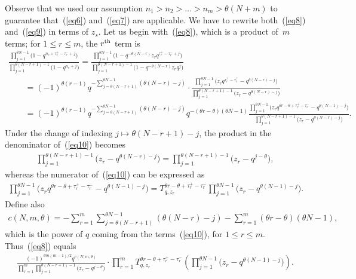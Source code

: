 \documentclass[pdftex]{sigma}
\numberwithin{equation}{section}
\begin{document}
Observe that we used our assumption $n_1 > n_2 > \dots > n_m > \theta (N + m)$ to guarantee that~(\ref{eq6}) and~(\ref{eq7}) are applicable. We have to rewrite both~(\ref{eq8}) and~(\ref{eq9}) in terms of $z_s$. Let us begin with~(\ref{eq8}), which is a product of~$m$ terms; for $1\leq r\leq m$, the $r^{\rm th}$ term is
\begin{gather}
\frac{\prod\limits_{j=1}^{\theta N - 1}{\big(1 - q^{n_r + \tau_r^+ - \tau_r^- + j}\big)}}{\prod\limits_{j=1}^{\theta (N - r + 1) - 1}{\big(1 - q^{n_r + j}\big)}} = \frac{\prod\limits_{j = 1}^{\theta N - 1}{\big(1 - q^{-\theta(N-r)}z_rq^{\tau_r^+ - \tau_r^- + j}\big)}}{\prod\limits_{j=1}^{\theta (N - r + 1)- 1}{\big(1 - q^{-\theta(N - r)}z_r q^j\big)}}\nonumber\\
\qquad{} = (-1)^{\theta(r-1)}q^{-\sum\limits_{j=\theta(N-r+1)}^{\theta N - 1}{(\theta(N - r)-j)}}\cdot\frac{\prod\limits_{j=1}^{\theta N - 1}{\big(z_rq^{\tau_r^+ - \tau_r^+} - q^{\theta(N - r)-j}\big)}}{\prod\limits_{j=1}^{\theta(N-r+1)-1}{\big(z_r - q^{\theta(N-r)-j}\big)}}\label{eq10}\\
\qquad{}= (-1)^{\theta(r-1)} q^{-\sum\limits_{j=\theta(N-r+1)}^{\theta N - 1}{(\theta(N - r)-j)}} q^{-(\theta r - \theta)(\theta N - 1)}\frac{\prod\limits_{j=1}^{\theta N - 1}{\big(z_rq^{\theta r - \theta + \tau_r^+ - \tau_r^-} - q^{\theta(N-1) - j}\big)}}{\prod\limits_{j=1}^{\theta(N-r+1)-1}{\big(z_r - q^{\theta(N - r)-j}\big)}}.\nonumber
\end{gather}
Under the change of indexing $j \mapsto \theta(N-r+1)-j$, the product in the denominator of~(\ref{eq10}) becomes
\begin{gather*}
\prod_{j=1}^{\theta(N-r+1)-1}{\big(z_r - q^{\theta(N - r)-j}\big)} = \prod_{j=1}^{\theta(N-r+1)-1}{\big(z_r - q^{j - \theta}\big)},
 \end{gather*} whereas the numerator of~(\ref{eq10}) can be expressed as
\begin{gather*}
\prod_{j=1}^{\theta N - 1}{\big(z_rq^{\theta r - \theta + \tau_r^+ - \tau_r^-} - q^{\theta(N-1) - j}\big)} = T_{q, z_r}^{\theta r - \theta + \tau_r^+ - \tau_r^-}\prod_{j=1}^{\theta N - 1}{\big(z_r - q^{\theta(N - 1) - j}\big)}.
\end{gather*} Def\/ine also
\begin{gather}\label{eq11}
c(N, m, \theta) = -\sum_{r=1}^m{ \sum_{j=\theta(N-r+1)}^{\theta N - 1}{(\theta(N - r)-j )} } - \sum_{r=1}^{m}{(\theta r - \theta)(\theta N - 1)},
\end{gather}
which is the power of $q$ coming from the terms~(\ref{eq10}), for $1\leq r\leq m$. Thus~(\ref{eq8}) equals
\begin{gather}\label{eq12}
\frac{(-1)^{\theta m(m-1)/2}q^{c(N, m, \theta)}}{\prod\limits_{r=1}^m{\prod\limits_{j=1}^{\theta(N - r+1)-1}{\big(z_r - q^{j-\theta}\big)}}}\cdot\prod_{r=1}^m{T_{q, z_r}^{\theta r - \theta + \tau_r^+ - \tau_r^-}}\left( \prod_{j=1}^{\theta N - 1}{\big(z_r - q^{\theta(N - 1) - j}\big)} \right).
\end{gather}
\end{document}
